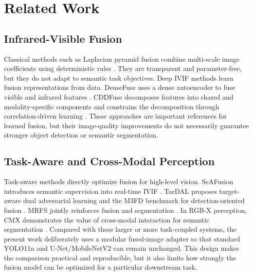 \documentclass[conference,a4paper]{IEEEtran}
\begin{document}
\section{Related Work}
\subsection{Infrared-Visible Fusion}
Classical methods such as Laplacian pyramid fusion combine multi-scale image coefficients using deterministic rules \cite{burt1983laplacian}. They are transparent and parameter-free, but they do not adapt to semantic task objectives. Deep IVIF methods learn fusion representations from data. DenseFuse uses a dense autoencoder to fuse visible and infrared features \cite{li2019densefuse}. CDDFuse decomposes features into shared and modality-specific components and constrains the decomposition through correlation-driven learning \cite{zhao2023cddfuse}. These approaches are important references for learned fusion, but their image-quality improvements do not necessarily guarantee stronger object detection or semantic segmentation.

\subsection{Task-Aware and Cross-Modal Perception}
Task-aware methods directly optimize fusion for high-level vision. SeAFusion introduces semantic supervision into real-time IVIF \cite{tang2022seafusion}. TarDAL proposes target-aware dual adversarial learning and the M3FD benchmark for detection-oriented fusion \cite{liu2022tardal}. MRFS jointly reinforces fusion and segmentation \cite{zhang2024mrfs}. In RGB-X perception, CMX demonstrates the value of cross-modal interaction for semantic segmentation \cite{zhang2023cmx}. Compared with these larger or more task-coupled systems, the present work deliberately uses a modular fused-image adapter so that standard YOLO11n and U-Net/MobileNetV2 can remain unchanged. This design makes the comparison practical and reproducible, but it also limits how strongly the fusion model can be optimized for a particular downstream task.
\end{document}
